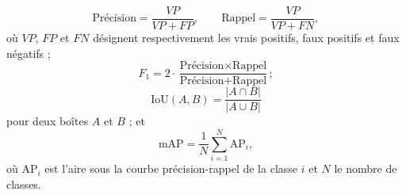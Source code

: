 \begin{equation}
  \text{Précision} = \frac{VP}{VP + FP}, \qquad
  \text{Rappel} = \frac{VP}{VP + FN},
  \label{eq-precision-rappel}
\end{equation}
où $VP$, $FP$ et $FN$ désignent respectivement les vrais positifs, faux
positifs et faux négatifs ;
\begin{equation}
  F_1 = 2 \cdot \frac{\text{Précision} \times \text{Rappel}}
                     {\text{Précision} + \text{Rappel}} ;
  \label{eq-f1}
\end{equation}
\begin{equation}
  \mathrm{IoU}(A, B) = \frac{|A \cap B|}{|A \cup B|}
  \label{eq-iou}
\end{equation}
pour deux boîtes $A$ et $B$ ; et
\begin{equation}
  \mathrm{mAP} = \frac{1}{N} \sum_{i=1}^{N} \mathrm{AP}_i,
  \label{eq-map}
\end{equation}
où $\mathrm{AP}_i$ est l'aire sous la courbe précision-rappel de la
classe $i$ et $N$ le nombre de classes.
